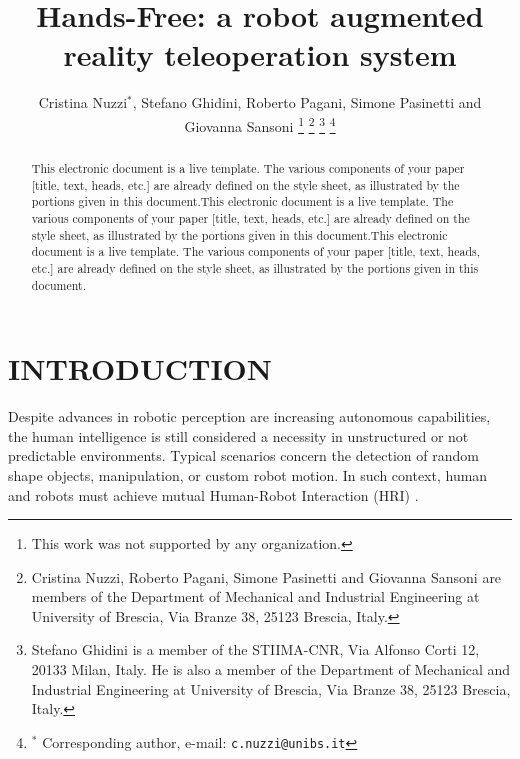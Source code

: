 \documentclass[a4paper, 10 pt, conference]{ieeeconf}      %
\title{\LARGE \bf
Hands-Free: a robot augmented reality teleoperation system
}
\author{Cristina Nuzzi$^{*}$, Stefano Ghidini, Roberto Pagani, Simone Pasinetti and Giovanna Sansoni %
\thanks{This work was not supported by any organization.}%
\thanks{Cristina Nuzzi, Roberto Pagani, Simone Pasinetti and Giovanna Sansoni are members of the Department of Mechanical and Industrial Engineering at University of Brescia, Via Branze 38, 25123 Brescia, Italy.}
\thanks{Stefano Ghidini is a member of the STIIMA-CNR, Via Alfonso Corti 12, 20133 Milan, Italy. He is also a member of the Department of Mechanical and Industrial Engineering at University of Brescia, Via Branze 38, 25123 Brescia, Italy.}
\thanks{$^{*}$ Corresponding author, e-mail: {\tt\small c.nuzzi@unibs.it}}%
}
\begin{document}
\maketitle
\thispagestyle{empty}
\pagestyle{empty}

\begin{abstract}

This electronic document is a live template. The various components of your paper [title, text, heads, etc.] are already defined on the style sheet, as illustrated by the portions given in this document.This electronic document is a live template. The various components of your paper [title, text, heads, etc.] are already defined on the style sheet, as illustrated by the portions given in this document.This electronic document is a live template. The various components of your paper [title, text, heads, etc.] are already defined on the style sheet, as illustrated by the portions given in this document.


\end{abstract}


\section{INTRODUCTION}
Despite advances in robotic perception are increasing autonomous capabilities, the human intelligence is still considered a necessity in unstructured or not predictable environments. Typical scenarios concern the detection of random shape objects, manipulation, or custom robot motion. In such context, human and robots must achieve mutual Human-Robot Interaction (HRI) \cite{Yanco2002}. 
\end{document}
